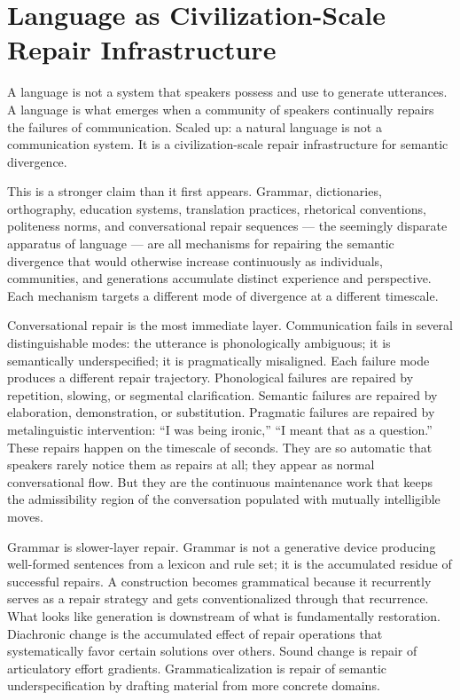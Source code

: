 \documentclass[11pt, a4paper]{article}
\theoremstyle{definition}
\theoremstyle{remark}
\begin{document}
\section{Language as Civilization-Scale Repair Infrastructure}

A language is not a system that speakers possess and use to generate utterances.
A language is what emerges when a community of speakers continually repairs the
failures of communication. Scaled up: a natural language is not a communication
system. It is a civilization-scale repair infrastructure for semantic divergence.

This is a stronger claim than it first appears. Grammar, dictionaries,
orthography, education systems, translation practices, rhetorical conventions,
politeness norms, and conversational repair sequences --- the seemingly
disparate apparatus of language --- are all mechanisms for repairing the
semantic divergence that would otherwise increase continuously as individuals,
communities, and generations accumulate distinct experience and perspective.
Each mechanism targets a different mode of divergence at a different timescale.

Conversational repair is the most immediate layer. Communication fails in
several distinguishable modes: the utterance is phonologically ambiguous; it
is semantically underspecified; it is pragmatically misaligned. Each failure
mode produces a different repair trajectory. Phonological failures are repaired
by repetition, slowing, or segmental clarification. Semantic failures are
repaired by elaboration, demonstration, or substitution. Pragmatic failures are
repaired by metalinguistic intervention: ``I was being ironic,'' ``I meant
that as a question.'' These repairs happen on the timescale of seconds. They
are so automatic that speakers rarely notice them as repairs at all; they appear
as normal conversational flow. But they are the continuous maintenance work
that keeps the admissibility region of the conversation populated with mutually
intelligible moves.

Grammar is slower-layer repair. Grammar is not a generative device producing
well-formed sentences from a lexicon and rule set; it is the accumulated residue
of successful repairs. A construction becomes grammatical because it recurrently
serves as a repair strategy and gets conventionalized through that recurrence.
What looks like generation is downstream of what is fundamentally restoration.
Diachronic change is the accumulated effect of repair operations that
systematically favor certain solutions over others. Sound change is repair of
articulatory effort gradients. Grammaticalization is repair of semantic
underspecification by drafting material from more concrete domains.
\end{document}

